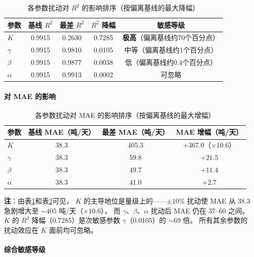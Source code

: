 \documentclass[12pt,a4paper]{ctexart}
\begin{document}
\begin{table}[htbp]
\centering
\caption{各参数扰动对 $R^2$ 的影响排序（按偏离基线的最大降幅）}
\label{tab:sensitivity_r2}
\begin{tabular}{lcccc}
\toprule
参数 & 基线 $R^2$ & 最差 $R^2$ & $R^2$ 降幅 & 敏感等级 \\
\midrule
$K$      & 0.9915 & 0.2630 & 0.7285 & \textbf{极高}（偏离基线约70个百分点）\\
$\gamma$ & 0.9915 & 0.9810 & 0.0105 & 中等（偏离基线约1个百分点）\\
$\beta$  & 0.9915 & 0.9877 & 0.0038 & 低（偏离基线约0.4个百分点）\\
$\alpha$ & 0.9915 & 0.9913 & 0.0002 & 可忽略 \\
\bottomrule
\end{tabular}
\end{table}

\paragraph{对 MAE 的影响}

\begin{table}[htbp]
\centering
\caption{各参数扰动对 MAE 的影响排序（按偏离基线的最大增幅）}
\label{tab:sensitivity_mae}
\begin{tabular}{lccc}
\toprule
参数 & 基线 MAE（吨/天） & 最差 MAE（吨/天） & MAE 增幅（吨/天） \\
\midrule
$K$      & 38.3 & 405.3 & $+367.0$（$\times 10.6$）\\
$\gamma$ & 38.3 & 59.8  & $+21.5$ \\
$\beta$  & 38.3 & 49.7  & $+11.4$ \\
$\alpha$ & 38.3 & 41.0  & $+2.7$ \\
\bottomrule
\end{tabular}
\end{table}

\textbf{注}：由表\ref{tab:sensitivity_r2}和表\ref{tab:sensitivity_mae}可见，
$K$ 的主导地位是量级上的——$\pm 10\%$ 扰动使 MAE 从 38.3 急剧增大至 $\sim 405$ 吨/天（$\times 10.6$），
而 $\gamma$、$\beta$、$\alpha$ 扰动后 MAE 仍在 37--60 之间。
$K$ 的 $R^2$ 降幅（0.7285）是次敏感参数 $\gamma$（0.0105）的 $\sim 69$ 倍。
所有其余参数的扰动效应在 $K$ 面前均可忽略。

\paragraph{综合敏感等级}
\end{document}
